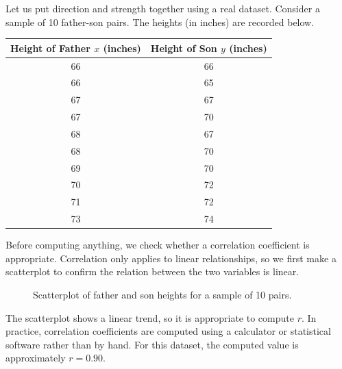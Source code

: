 \begin{Worked}
\begin{Problem}
Let us put direction and strength together using a real dataset.
Consider a sample of 10 father-son pairs. The heights (in inches)
are recorded below.

\begin{center}
\begin{tabular}{|c|c|}
\hline
Height of Father $x$ (inches) & Height of Son $y$ (inches) \\
\hline
66 & 66 \\
\hline
66 & 65 \\
\hline
67 & 67 \\
\hline
67 & 70 \\
\hline
68 & 67 \\
\hline
68 & 70 \\
\hline
69 & 70 \\
\hline
70 & 72 \\
\hline
71 & 72 \\
\hline
73 & 74 \\
\hline
\end{tabular}
\end{center}
\end{Problem}
\begin{Solution}
Before computing anything, we check whether a correlation coefficient
is appropriate. Correlation only applies to linear relationships, so
we first make a scatterplot to confirm the relation between the two
variables is linear. 

\begin{figure}[H]
    \centering
    \caption{Scatterplot of father and son heights for a sample of 10 pairs.}
    \label{fig:fatherson}
\end{figure}

The scatterplot shows a linear trend, so it is appropriate to compute
$r$. In practice, correlation coefficients are computed using a
calculator or statistical software rather than by hand. For this
dataset, the computed value is approximately $r = 0.90$.


\end{Solution}
\end{Worked}
